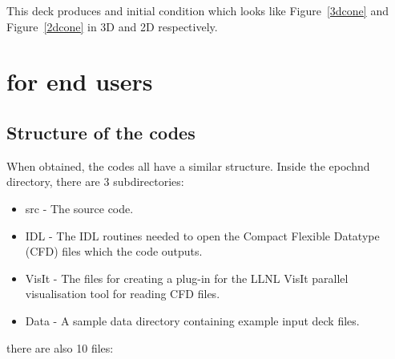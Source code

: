\documentclass[12pt,a4paper]{article}
\newcommand{\EPOCH}{{\color{warwickdark}\fontfamily{phv}\selectfont{EPOCH}}}
\begin{document}
This deck produces and initial condition which looks like Figure~\ref{3dcone}
and Figure~\ref{2dcone} in 3D and 2D respectively.
\pagebreak

\section{{\EPOCH} for end users}

\subsection{Structure of the {\EPOCH} codes}
When obtained, the {\EPOCH} codes all have a similar structure. Inside the
epoch{n}d directory, there are 3 subdirectories:

\begin{itemize}
\item src - The {\EPOCH} source code.
\item IDL - The IDL routines needed to open the Compact Flexible Datatype
  (CFD) files which the code outputs.
\item VisIt - The files for creating a plug-in for the LLNL VisIt parallel
  visualisation tool for reading CFD files.
\item Data - A sample data directory containing example input deck files.
\end{itemize}
there are also 10 files:
\end{document}
